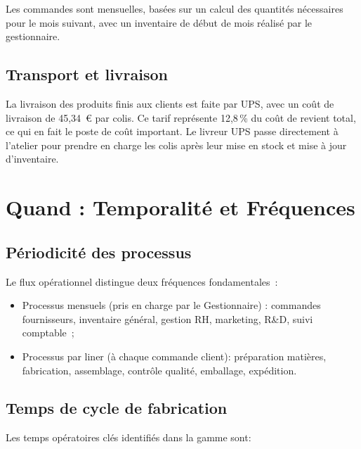Les commandes sont mensuelles, basées sur un calcul des quantités nécessaires pour le
mois suivant, avec un inventaire de début de mois réalisé par le gestionnaire.

\subsection{Transport et livraison}

La livraison des produits finis aux clients est faite par UPS, avec un coût de livraison de
45,34~\euro{} par colis. Ce tarif représente 12,8\,\% du coût de revient
total, ce qui en fait le poste de coût important. Le livreur
UPS passe directement à l'atelier pour prendre en charge les colis après leur mise en stock et mise à
jour d'inventaire.

\section{Quand : Temporalité et Fréquences}

\subsection{Périodicité des processus}

Le flux opérationnel distingue deux fréquences fondamentales~:

\begin{itemize}
  \item Processus mensuels (pris en charge par le Gestionnaire) : commandes fournisseurs, inventaire
    général, gestion RH, marketing, R\&D, suivi comptable~;
  \item Processus par liner (à chaque commande client): préparation matières,
    fabrication, assemblage, contrôle qualité, emballage, expédition.
\end{itemize}

\subsection{Temps de cycle de fabrication}

Les temps opératoires clés identifiés dans la gamme sont:

